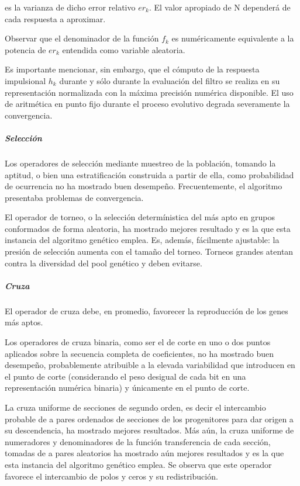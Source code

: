 \documentclass[11pt]{article}
\begin{document}
es la varianza de dicho error relativo \(er_k\). El valor apropiado de N
dependerá de cada respuesta a aproximar.

Observar que el denominador de la función \(f_k\) es numéricamente
equivalente a la potencia de \(er_k\) entendida como variable aleatoria.

Es importante mencionar, sin embargo, que el cómputo de la respuesta
impulsional \(h_k\) durante y sólo durante la evaluación del filtro se
realiza en su representación normalizada con la máxima precisión
numérica disponible. El uso de aritmética en punto fijo durante el
proceso evolutivo degrada severamente la convergencia.

\subparagraph{Selección}\label{selecciuxf3n}

Los operadores de selección mediante muestreo de la población, tomando
la aptitud, o bien una estratificación construida a partir de ella, como
probabilidad de ocurrencia no ha mostrado buen desempeño.
Frecuentemente, el algoritmo presentaba problemas de convergencia.

El operador de torneo, o la selección determínistica del más apto en
grupos conformados de forma aleatoria, ha mostrado mejores resultado y
es la que esta instancia del algoritmo genético emplea. Es, además,
fácilmente ajustable: la presión de selección aumenta con el tamaño del
torneo. Torneos grandes atentan contra la diversidad del pool genético y
deben evitarse.

\subparagraph{Cruza}\label{cruza}

El operador de cruza debe, en promedio, favorecer la reproducción de los
genes más aptos.

Los operadores de cruza binaria, como ser el de corte en uno o dos
puntos aplicados sobre la secuencia completa de coeficientes, no ha
mostrado buen desempeño, probablemente atribuible a la elevada
variabilidad que introducen en el punto de corte (considerando el peso
desigual de cada bit en una representación numérica binaria) y
únicamente en el punto de corte.

La cruza uniforme de secciones de segundo orden, es decir el intercambio
probable de a pares ordenados de secciones de los progenitores para dar
origen a su descendencia, ha mostrado mejores resultados. Más aún, la
cruza uniforme de numeradores y denominadores de la función
transferencia de cada sección, tomadas de a pares aleatorios ha mostrado
aún mejores resultados y es la que esta instancia del algoritmo genético
emplea. Se observa que este operador favorece el intercambio de polos y
ceros y su redistribución.
\end{document}
